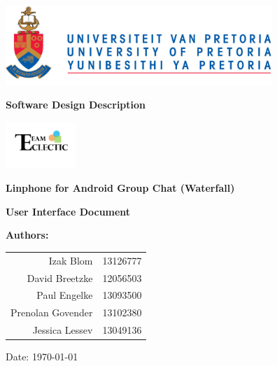 \begin{titlepage}
\begin{flushright}

\includegraphics[width=380px]{images/University_of_Pretoria_Logo.png}
\newline
\newline

\textbf {\LARGE Software Design Description} \newline

\centering\includegraphics[width=100px]{../../global/Logo.jpg}

\textbf {\Large Linphone for Android Group Chat (Waterfall)}\newline

\textbf {\large User Interface Document}\newline

\centering \textbf {\large Authors:}

\begin{table}[H]
\large
\centering
\begin{tabular}{rl}
	Izak Blom & 13126777 \\
	David Breetzke & 12056503 \\
	Paul Engelke & 13093500 \\
	Prenolan Govender & 13102380 \\
	Jessica Lessev & 13049136 \\
\end{tabular}
\end{table}

Date: \today

\end{flushright}
\end{titlepage}